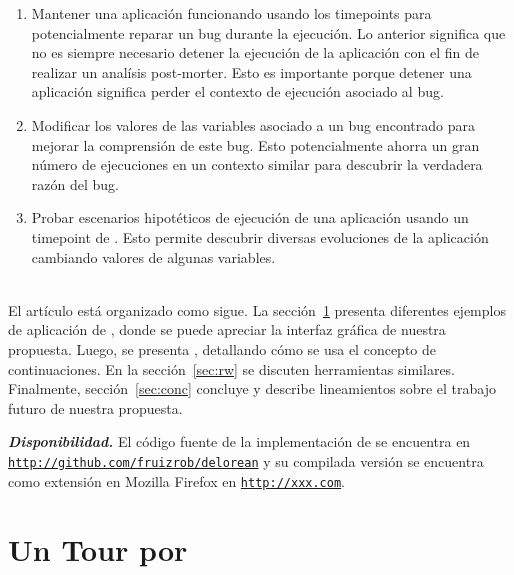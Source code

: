 \documentclass[conference]{IEEEtran}
\begin{document}
\begin{enumerate}
	\item Mantener una aplicaci\'on funcionando usando los timepoints para potencialmente reparar un bug durante la ejecuci\'on. Lo anterior significa que no es siempre necesario detener la ejecuci\'on de la aplicaci\'on con el fin de realizar un anal\'isis post-morter. Esto es importante porque detener una aplicaci\'on significa perder el contexto de ejecuci\'on asociado al bug.
	
	\item Modificar los valores de las variables asociado a un bug encontrado para mejorar la comprensi\'on de este bug. Esto potencialmente ahorra un gran n\'umero de ejecuciones en un contexto similar para descubrir la verdadera raz\'on del bug.
	    

	\item Probar escenarios hipot\'eticos de ejecuci\'on de una aplicaci\'on usando un timepoint de \deloreanjs. Esto permite descubrir diversas evoluciones de la aplicaci\'on cambiando valores de algunas variables.      

\end{enumerate}

\smallskip

\\


El art\'iculo est\'a organizado como sigue. La secci\'on~\ref{sec:tour} presenta diferentes ejemplos de aplicaci\'on de \deloreanjs, donde se puede apreciar la interfaz gr\'afica de nuestra propuesta. Luego, se presenta \deloreanjs, detallando c\'omo se usa el concepto de continuaciones. En la secci\'on~\ref{sec:rw} se discuten herramientas similares. Finalmente, secci\'on~\ref{sec:conc} concluye y describe lineamientos sobre el trabajo futuro de nuestra propuesta.      

\smallskip

{\bf {\em Disponibilidad.}} El c\'odigo fuente de la implementaci\'on de \deloreanjs se encuentra en {\tt \url{http://github.com/fruizrob/delorean}} y su compilada versi\'on se encuentra como extensi\'on en Mozilla Firefox en {\tt \url{http://xxx.com}}. 



\section{Un Tour por \deloreanjs}
\label{sec:tour}

\end{document}
